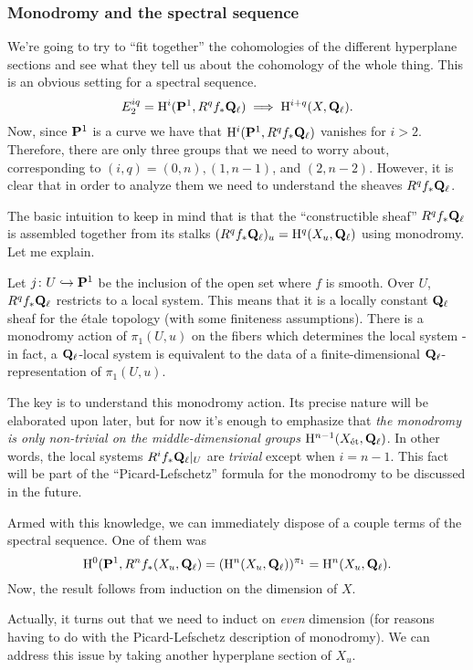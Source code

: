 \subsubsection{Monodromy and the spectral sequence}


We're going to try to ``fit together'' the cohomologies of the different hyperplane sections and see what they tell us about the cohomology of the whole thing. This is an obvious setting for a spectral sequence. 
\[
E_2^{iq} = \mathrm{H}^i(\mathbf{P}^1, R^qf_* \mathbf{Q}_{\ell}) \implies \mathrm{H}^{i+q}(X, \mathbf{Q}_{\ell}). 
\]
Now, since $\mathbf{P}^1$ is a curve we have that $\mathrm{H}^i(\mathbf{P}^1, R^q f_* \mathbf{Q}_{\ell})$ vanishes for $i > 2$. Therefore, there are only three groups that we need to worry about, corresponding to $(i,q) = (0,n), (1,n-1)$, and $(2,n-2)$. However, it is clear that in order to analyze them we need to understand the sheaves $R^qf_* \mathbf{Q}_{\ell}$. 

The basic intuition to keep in mind that is that the ``constructible sheaf'' $R^qf_* \mathbf{Q}_{\ell}$ is assembled together from its stalks $(R^q f_* \mathbf{Q}_{\ell})_u = \mathrm{H}^q(X_u, \mathbf{Q}_{\ell})$ using monodromy. Let me explain. 

Let $j \colon U \hookrightarrow \mathbf{P}^1$ be the inclusion of the open set where $f$ is smooth. Over $U$, $R^qf_* \mathbf{Q}_{\ell}$ restricts to a local system. This means that it is a locally constant $\mathbf{Q}_{\ell}$ sheaf for the \'{e}tale topology (with some finiteness assumptions). There is a monodromy action of $\pi_1(U, u)$ on the fibers which determines the local system - in fact, a $\mathbf{Q}_{\ell}$-local system is equivalent to the data of a finite-dimensional $\mathbf{Q}_{\ell}$-representation of $\pi_1(U,u)$. 

The key is to understand this monodromy action. Its precise nature will be elaborated upon later, but for now it's enough to emphasize that \emph{the monodromy is only non-trivial on the middle-dimensional groups} $\mathrm{H}^{n-1}(X_{\operatorname{\acute{e}t}}, \mathbf{Q}_{\ell})$. In other words, the local systems $R^{i}f_* \mathbf{Q}_{\ell}|_U$ are \emph{trivial} except when $i=n-1$. This fact will be part of the ``Picard-Lefschetz'' formula for the monodromy to be discussed in the future. 

Armed with this knowledge, we can immediately dispose of a couple terms of the spectral sequence. One of them was 
\[
\mathrm{H}^0(\mathbf{P}^1, R^n f_* (X_u, \mathbf{Q}_{\ell}) = (\mathrm{H}^{n}(X_u, \mathbf{Q}_{\ell}))^{\pi_1} = \mathrm{H}^{n}(X_u, \mathbf{Q}_{\ell}).
\]
Now, the result follows from induction on the dimension of $X$. 

\begin{rem}
Actually, it turns out that we need to induct on \emph{even} dimension (for reasons having to do with the Picard-Lefschetz description of monodromy). We can address this issue by taking another hyperplane section of $X_u$.
\end{rem}



